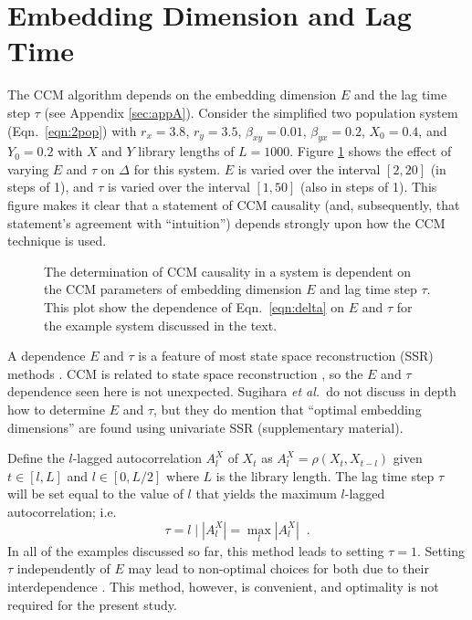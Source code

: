 \documentclass[a4paper,11pt]{article}
\begin{document}
\section{Embedding Dimension and Lag Time}
The CCM algorithm depends on the embedding dimension $E$ and the lag time step $\tau$ (see Appendix \ref{sec:appA}).  Consider the simplified two population system (Eqn.\ \ref{eqn:2pop}) with $r_x=3.8$, $r_y=3.5$, $\beta_{xy}=0.01$, $\beta_{yx}=0.2$, $X_0=0.4$, and $Y_0=0.2$ with $X$ and $Y$ library lengths of $L=1000$.  Figure \ref{fig:} shows the effect of varying $E$ and $\tau$ on $\Delta$ for this system.  $E$ is varied over the interval $[2,20]$ (in steps of 1), and $\tau$ is varied over the interval $[1,50]$ (also in steps of 1).  This figure makes it clear that a statement of CCM causality (and, subsequently, that statement's agreement with ``intuition'') depends strongly upon how the CCM technique is used.
\begin{figure}[ht]
\label{fig:}
\caption{The determination of CCM causality in a system is dependent on the CCM parameters of embedding dimension $E$ and lag time step $\tau$.  This plot show the dependence of Eqn.\ \ref{eqn:delta} on $E$ and $\tau$ for the example system discussed in the text.}
\end{figure}

A dependence $E$ and $\tau$ is a feature of most state space reconstruction (SSR) methods \cite{Hong2006,vlachos2009,Small2004}.  CCM is related to state space reconstruction \cite{Sugihara2012}, so the $E$ and $\tau$ dependence seen here is not unexpected.  Sugihara {\em et al.\ }do not discuss in depth how to determine $E$ and $\tau$, but they do mention that ``optimal embedding dimensions'' are found using univariate SSR \cite{Sugihara2012} (supplementary material).  

Define the $l$-lagged autocorrelation $A_l^X$ of $X_t$ as $A_l^X=\rho\left(X_t,X_{t-l}\right)$ given $t\in[l,L]$ and $l\in[0,L/2]$ where $L$ is the library length.  The lag time step $\tau$ will be set equal to the value of $l$ that yields the maximum $l$-lagged autocorrelation; i.e.\
\begin{equation}
\tau = l \;|\; \left|A_l^X\right| = \max_l \left|A_l^X\right|\;\;.
\end{equation}
In all of the examples discussed so far, this method leads to setting $\tau=1$.  Setting $\tau$ independently of $E$ may lead to non-optimal choices for both due to their interdependence \cite{Small2004}.  This method, however, is convenient, and optimality is not required for the present study.
\end{document}
